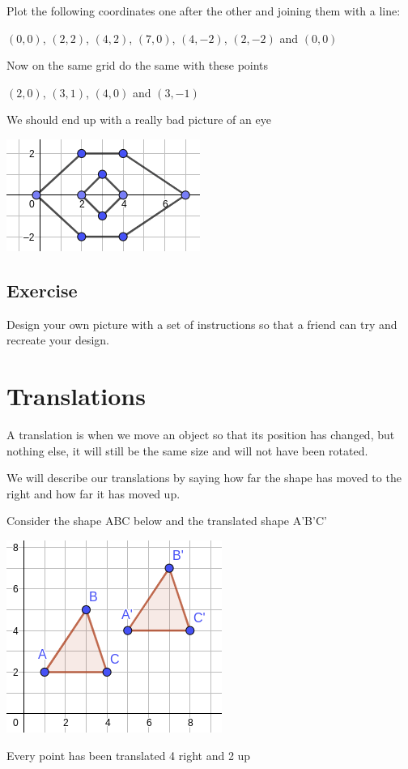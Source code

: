 \begin{exmp}
	Plot the following coordinates one after the other and joining them with a line:

	$(0, 0)$, $(2, 2)$, $(4, 2)$, $(7, 0)$, $(4, -2)$, $(2, -2)$ and $(0,0)$

	Now on the same grid do the same with these points

	$(2, 0)$, $(3, 1)$, $(4, 0)$ and $(3, -1)$

	We should end up with a really bad picture of an eye
	\begin{center}
	\includegraphics[scale=0.5]{./Images/Transformations/Coord_eg_2.png}
	\end{center}
\end{exmp}

\subsection{Exercise}
Design your own picture with a set of instructions so that a friend can try and recreate your design.
\section{Translations}
A translation is when we move an object so that its position has changed, but nothing else, it will still be the same size and will not have been rotated.

We will describe our translations by saying how far the shape has moved to the right and how far it has moved up.

\begin{exmp}
	Consider the shape ABC below and the translated shape A'B'C'
	\begin{center}
	\includegraphics[scale=0.5]{./Images/Transformations/Trans_eg_1.png}
	\end{center}
	Every point has been translated 4 right and 2 up
\end{exmp}

